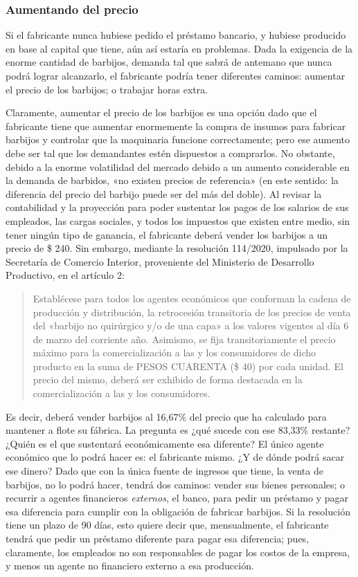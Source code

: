 \documentclass[12pt,a4paper,twoside]{book}
\begin{document}
\subsubsection{Aumentando del precio}
Si el fabricante nunca hubiese pedido el préstamo bancario, y hubiese producido en base al capital que tiene, aún así estaría en problemas. Dada la exigencia de la enorme cantidad de barbijos, demanda tal que sabrá de antemano que nunca podrá lograr alcanzarlo, el fabricante podría tener diferentes caminos: aumentar el precio de los barbijos; o trabajar horas extra.

Claramente, aumentar el precio de los barbijos es una opción dado que el fabricante tiene que aumentar enormemente la compra de insumos para fabricar barbijos y controlar que la maquinaria funcione correctamente; pero ese aumento debe ser tal que los demandantes estén dispuestos a comprarlos. No obstante, debido a la enorme volatilidad del mercado debido a un aumento considerable en la demanda de barbidos, «no existen precios de referencia» (en este sentido: la diferencia del precio del barbijo puede ser del más del doble). Al revisar la contabilidad y la proyección para poder sustentar los pagos de los salarios de sus empleados, las cargas sociales, y todos los impuestos que existen entre medio, sin tener ningún tipo de ganancia, el fabricante deberá vender los barbijos a un precio de \$ 240. Sin embargo, mediante la resolución 114/2020, impulsado por la Secretaría de Comercio Interior, proveniente del Ministerio de Desarrollo Productivo, en el artículo 2:

\begin{quotation}
Establécese para todos los agentes económicos que conforman la cadena de producción y distribución, la retrocesión transitoria de los precios de venta del «barbijo no quirúrgico y/o de una capa» a los valores vigentes al día 6 de marzo del corriente año. Asimismo, se fija transitoriamente el precio máximo para la comercialización a las y los consumidores de dicho producto en la suma de PESOS CUARENTA (\$ 40) por cada unidad. El precio del mismo, deberá ser exhibido de forma destacada en la comercialización a las y los consumidores. \cite{resolucion:barbijos}
\end{quotation}

Es decir, deberá vender barbijos al 16,67\% del precio que ha calculado para mantener a flote su fábrica. La pregunta es ¿qué sucede con ese 83,33\% restante? ¿Quién es el que sustentará económicamente esa diferente? El único agente económico que lo podrá hacer es: el fabricante mismo. ¿Y de dónde podrá sacar ese dinero? Dado que con la única fuente de ingresos que tiene, la venta de barbijos, no lo podrá hacer, tendrá dos caminos: vender sus bienes personales; o recurrir a agentes financieros \textit{externos}, el banco, para pedir un préstamo y pagar esa diferencia para cumplir con la obligación de fabricar barbijos. Si la resolución tiene un plazo de 90 días, esto quiere decir que, mensualmente, el fabricante tendrá que pedir un préstamo diferente para pagar esa diferencia; pues, claramente, los empleados no son responsables de pagar los costos de la empresa, y menos un agente no financiero externo a esa producción.
\end{document}
